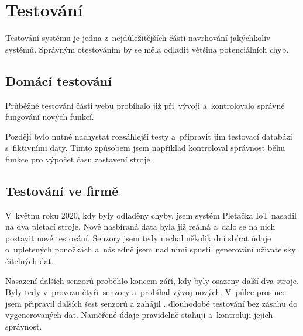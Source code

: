 \chapter{Testování}
Testování systému je jedna z~nejdůležitějších částí navrhování jakýchkoliv systémů.
Správným otestováním by se měla odladit většina potenciálních chyb.



\section{Domácí testování}
Průběžné testování částí webu probíhalo již při~vývoji a~kontrolovalo správné fungování nových funkcí.

Později bylo nutné nachystat rozsáhlejší testy a~připravit jim testovací databázi s~fiktivními daty.
Tímto způsobem jsem například kontroloval správnost běhu funkce pro výpočet času zastavení stroje.


\section{Testování ve firmě}
V~květnu roku 2020, kdy byly odladěny chyby, jsem systém Pletačka IoT nasadil na dva pletací stroje.
Nově nasbíraná data byla již reálná a~dalo se na nich postavit nové testování.
Senzory jsem tedy nechal několik dní sbírat údaje o~upletených ponožkách a~následně jsem nad nimi spustil generování uživatelsky čitelných dat.

Nasazení dalších senzorů proběhlo koncem září, kdy byly osazeny další dva stroje. Byly tedy v provozu čtyři senzory a probíhal vývoj nových.
V půlce prosince jsem připravil dalších šest senzorů a zahájil . dlouhodobé testování bez zásahu do vygenerovaných dat. Naměřené údaje pravidelně stahuji a kontroluji jejich správnost.

\newpage